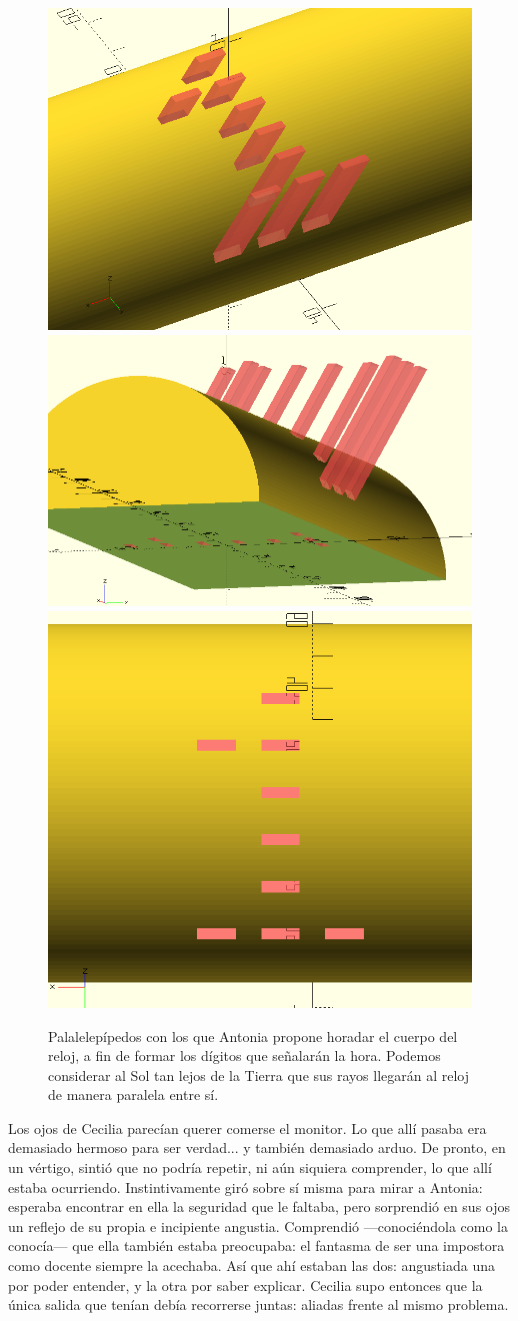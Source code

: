   \begin{figure}[t]
    \centering
    \includegraphics[width=.49\textwidth]{imagenes/digito-corte-1}\hfill
    \includegraphics[width=.49\textwidth]{imagenes/digito-corte-2}
        \includegraphics[width=.5\textwidth]{imagenes/digito-corte-3}
        \caption{Palalelepípedos con los que Antonia propone horadar
          el cuerpo del reloj, a fin de formar los dígitos que
          señalarán la hora. Podemos considerar al Sol tan lejos de
          la Tierra que sus rayos llegarán al reloj de manera paralela
          entre sí.}
    \label{fig:digitos-cortes}
  \end{figure}

  Los ojos de Cecilia parecían querer comerse el monitor. Lo que allí
  pasaba era demasiado hermoso para ser verdad... y también demasiado
  arduo. De pronto, en un vértigo, sintió que no podría repetir, ni
  aún siquiera comprender, lo que allí estaba
  ocurriendo. Instintivamente giró sobre sí misma para mirar a
  Antonia: esperaba encontrar en ella la seguridad que le faltaba,
  pero sorprendió en sus ojos un reflejo de su propia e incipiente
  angustia. Comprendió ---conociéndola como la conocía--- que ella
  también estaba preocupaba: el fantasma de ser una impostora como
  docente siempre la acechaba. Así que ahí estaban las dos: angustiada
  una por poder entender, y la otra por saber explicar. Cecilia supo
  entonces que la única salida que tenían debía recorrerse juntas:
  aliadas frente al mismo problema.


